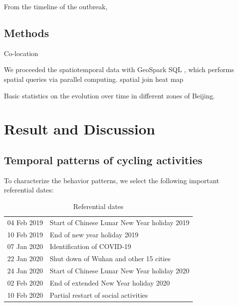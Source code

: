 \documentclass[preprints,ijgi,submit,moreauthors]{Definitions/mdpi}
\begin{document}
From the timeline \cite{li2020early} of the outbreak, 

\subsection{Methods}
Co-location

We proceeded the spatiotemporal data with GeoSpark SQL \cite{huang2017geospark}, which performs spatial queries via parallel computing.
spatial join 
heat map

Basic statistics on the evolution over time in different zones of Beijing. 

\section{Result and Discussion}
\subsection{Temporal patterns of cycling activities}
To characterize the behavior patterns, we select the following important referential dates: 

\begin{table}[H]
    \centering
    \begin{tabular}{ll}
    04 Feb 2019 & Start of Chinese Lunar New Year holiday 2019 \\
    10 Feb 2019 & End of new year holiday 2019\\
    07 Jan 2020 & Identification of COVID-19\\
    22 Jan 2020 & Shut down of Wuhan and other 15 cities\\
    24 Jan 2020 & Start of Chinese Lunar New Year holiday 2020\\
    02 Feb 2020 & End of extended New Year holiday 2020\\
    10 Feb 2020 & Partial restart of social activities
    \end{tabular}
    \caption{Referential dates}
    \label{tab:my_label}
\end{table}


\end{document}
